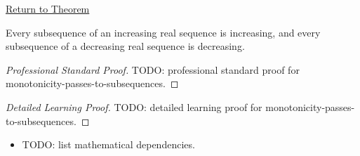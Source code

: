 \newpage
{}
\label{prf:monotonicity-passes-to-subsequences}

\begin{remark*}[Return]
\hyperref[thm:monotonicity-passes-to-subsequences]{Return to Theorem}
\end{remark*}

\begin{theorem*}
Every subsequence of an increasing real sequence is increasing, and every
subsequence of a decreasing real sequence is decreasing.

\smallskip
\noindent
\end{theorem*}

\begin{proof}[Professional Standard Proof]
\LRAProofBodyStart
TODO: professional standard proof for monotonicity-passes-to-subsequences.
\end{proof}

\begin{proof}[Detailed Learning Proof]
\LRAProofBodyStart
TODO: detailed learning proof for monotonicity-passes-to-subsequences.
\end{proof}

\begin{remark*}
\end{remark*}

\begin{dependencies}
\begin{itemize}
  \item TODO: list mathematical dependencies.
\end{itemize}
\end{dependencies}

\clearpage
